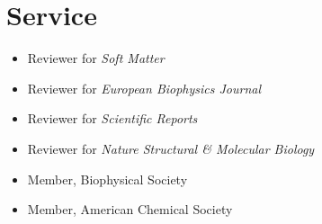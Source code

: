 \documentclass[letterpaper,11pt]{article}
\begin{document}
\section{Service}
\begin{itemize}
    \item Reviewer for \emph{Soft Matter}
    \item Reviewer for \emph{European Biophysics Journal}
    \item Reviewer for \emph{Scientific Reports}
    \item Reviewer for \emph{Nature Structural \& Molecular Biology}
    \item Member, Biophysical Society
    \item Member, American Chemical Society
\end{itemize}
\end{document}
